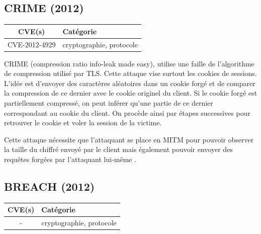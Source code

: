 

\subsection{CRIME (2012)}

\begin{tabularx}{0.96\textwidth}{|c|X|}
  \hline
  \textbf{CVE(s)} & \textbf{Catégorie} \\
  \hline
  CVE-2012-4929 & cryptographie, protocole \\
  \hline
\end{tabularx}

\vspace{1em}

CRIME (compression ratio info-leak made easy), utilise une faille de l'algorithme de compression utilisé par TLS. Cette attaque vise surtout les cookies de sessions. L'idée est d'envoyer des caractères aléatoires dans un cookie forgé et de comparer la compression de ce dernier avec le cookie originel du client. Si le cookie forgé est partiellement compressé, on peut inférer qu'une partie de ce dernier correspondant au cookie du client. On procède ainsi par étapes successives pour retrouver le cookie et voler la session de la victime.

Cette attaque nécessite que l'attaquant se place en MITM pour pouvoir observer la taille du chiffré envoyé par le client mais également pouvoir envoyer des requêtes forgées par l'attaquant lui-même \cite{crime}.




\subsection{BREACH (2012)}

\begin{tabularx}{0.96\textwidth}{|c|X|}
  \hline
  \textbf{CVE(s)} & \textbf{Catégorie} \\
  \hline
  - & cryptographie, protocole \\
  \hline
\end{tabularx}

\vspace{1em}



